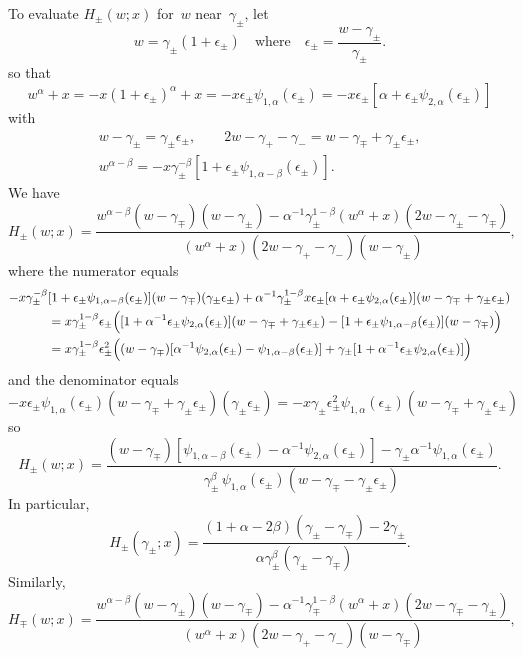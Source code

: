 \documentclass[12pt,a4paper]{article}
\begin{document}
To evaluate $H_\pm(w;x)$ for~$w$ near~$\gamma_\pm$, let
\[
w=\gamma_\pm(1+\epsilon_\pm)\quad\text{where}\quad
\epsilon_\pm=\frac{w-\gamma_\pm}{\gamma_\pm}.
\]
so that
\[
w^\alpha+x=-x(1+\epsilon_\pm)^\alpha+x
    =-x\epsilon_\pm\psi_{1,\alpha}(\epsilon_\pm)
    =-x\epsilon_\pm[\alpha+\epsilon_\pm\psi_{2,\alpha}(\epsilon_\pm)]
\]
with
\begin{gather*}
w-\gamma_\pm=\gamma_\pm\epsilon_\pm,\qquad
2w-\gamma_+-\gamma_-=w-\gamma_\mp+\gamma_\pm\epsilon_\pm,\\
w^{\alpha-\beta}=-x\gamma_\pm^{-\beta}
    [1+\epsilon_\pm\psi_{1,\alpha-\beta}(\epsilon_\pm)].
\end{gather*}
We have
\[
H_\pm(w;x)=\frac{w^{\alpha-\beta}(w-\gamma_\mp)(w-\gamma_\pm)
-\alpha^{-1}\gamma_\pm^{1-\beta}(w^\alpha+x)(2w-\gamma_\pm-\gamma_\mp)}%
{(w^\alpha+x)(2w-\gamma_+-\gamma_-)(w-\gamma_\pm)},
\]
where the numerator equals
\begin{align*}
-x\gamma_\pm^{-\beta}&[1+\epsilon_\pm\psi_{1,\alpha-\beta}(\epsilon_\pm)]
(w-\gamma_\mp)(\gamma_\pm\epsilon_\pm)
+\alpha^{-1}\gamma_\pm^{1-\beta}
x\epsilon_\pm[\alpha+\epsilon_\pm\psi_{2,\alpha}(\epsilon_\pm)]
(w-\gamma_\mp+\gamma_\pm\epsilon_\pm)\\
&=x\gamma_\pm^{1-\beta}\epsilon_\pm\Bigl(
[1+\alpha^{-1}\epsilon_\pm\psi_{2,\alpha}(\epsilon_\pm)]
(w-\gamma_\mp+\gamma_\pm\epsilon_\pm)
-[1+\epsilon_\pm\psi_{1,\alpha-\beta}(\epsilon_\pm)](w-\gamma_\mp)
\Bigr)\\
&=x\gamma_\pm^{1-\beta}\epsilon_\pm^2\Bigl((w-\gamma_\mp)
[\alpha^{-1}\psi_{2,\alpha}(\epsilon_\pm)-\psi_{1,\alpha-\beta}(\epsilon_\pm)]
+\gamma_\pm[1+\alpha^{-1}\epsilon_\pm\psi_{2,\alpha}(\epsilon_\pm)]\Bigr)
\end{align*}
and the denominator equals
\[
-x\epsilon_\pm\psi_{1,\alpha}(\epsilon_\pm)
(w-\gamma_\mp+\gamma_\pm\epsilon_\pm)
(\gamma_\pm\epsilon_\pm)=-x\gamma_\pm\epsilon_\pm^2\psi_{1,\alpha}(\epsilon_\pm)
(w-\gamma_\mp+\gamma_\pm\epsilon_\pm)
\]
so
\[
H_\pm(w;x)=\frac{(w-\gamma_\mp)
[\psi_{1,\alpha-\beta}(\epsilon_\pm)-\alpha^{-1}\psi_{2,\alpha}(\epsilon_\pm)]
-\gamma_\pm\alpha^{-1}\psi_{1,\alpha}(\epsilon_\pm)}%
{\gamma_\pm^\beta\,\psi_{1,\alpha}
(\epsilon_\pm)(w-\gamma_\mp-\gamma_\pm\epsilon_\pm)}.
\]
In particular,
\[
H_\pm(\gamma_\pm;x)
=\frac{(1+\alpha-2\beta)(\gamma_\pm-\gamma_\mp)-2\gamma_\pm}%
{\alpha\gamma_\pm^\beta(\gamma_\pm-\gamma_\mp)}.
\]
Similarly,
\[
H_\mp(w;x)=\frac{w^{\alpha-\beta}(w-\gamma_\pm)(w-\gamma_\mp)
-\alpha^{-1}\gamma_\mp^{1-\beta}(w^\alpha+x)(2w-\gamma_\mp-\gamma_\pm)}%
{(w^\alpha+x)(2w-\gamma_+-\gamma_-)(w-\gamma_\mp)},
\]
\end{document}
